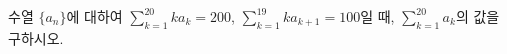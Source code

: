 수열 $\{a_n\}$에 대하여 $\displaystyle\sum_{k=1}^{20} ka_k=200$, $\displaystyle\sum_{k=1}^{19} ka_{k+1}=100$일 때, $\displaystyle\sum_{k=1}^{20} a_k$의 값을 구하시오.
